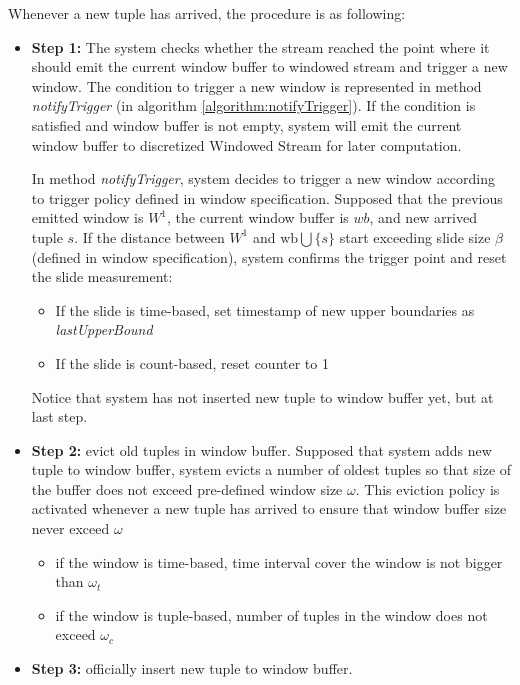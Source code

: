 Whenever a new tuple has arrived, the procedure is as following:
\begin{itemize}
\item \textbf{Step 1:} The system checks whether the stream reached the point where it should emit the current window buffer to windowed stream and trigger a new window. The condition to trigger a new window is represented in method \textit{notifyTrigger} (in algorithm \ref{algorithm:notifyTrigger}). If the condition is satisfied and window buffer is not empty, system will emit the current window buffer to discretized Windowed Stream for later computation.  

In method \textit{notifyTrigger}, system decides to trigger a new window according to trigger policy defined in window specification. 
Supposed that the previous emitted window is $W^1$, the current window buffer is $wb$, and new arrived tuple $s$.
If the distance between $W^1$ and $\textrm{wb} \bigcup \{s\}$ start exceeding slide size $\beta$ (defined in window specification), system confirms the trigger point and reset the slide measurement:
\begin{itemize}
\item If the slide is time-based, set timestamp of new upper boundaries as \textit{lastUpperBound}
\item If the slide is count-based, reset counter to 1

\end{itemize}

Notice that system has not inserted new tuple to window buffer yet, but at last step.

\item \textbf{Step 2: }evict old tuples in window buffer.
Supposed that system adds new tuple to window buffer, system evicts a number of oldest tuples so that size of the buffer does not exceed pre-defined window size $\omega$. This eviction policy is activated whenever a new tuple has arrived to ensure that window buffer size  never exceed $\omega$
\begin{itemize}
	\item if the window is time-based, time interval cover the window is not bigger than $\omega_t$
	\item if the window is tuple-based, number of tuples in the window does not exceed $\omega_c$
\end{itemize}
\item \textbf{Step 3:} officially insert new tuple to window buffer.
\end{itemize}

